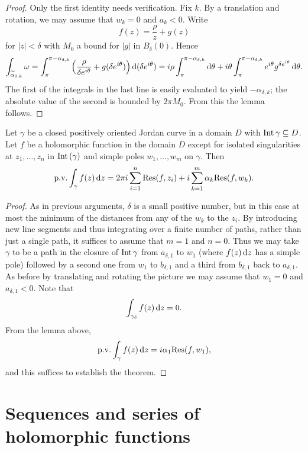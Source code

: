 \begin{proof}
Only the first identity needs verification. Fix $k$. By a translation and rotation, we may assume that $w_k=0$ and $a_k<0$. Write
\[f(z)=\frac{\rho}{z}+g(z)\]
for $|z|<\delta$ with $M_0$ a bound for $|g|$ in $B_{\delta}(0)$. Hence
\[\int_{\widetilde{\alpha}_{\delta,k}}\omega=\int_{\pi}^{\pi-\alpha_{\delta,k}}\Big(\frac{\rho}{\delta e^{i\theta}}+g(\delta e^{i\theta})\Big)\mathop{}\!\mathrm{d}(\delta e^{i\theta})=i\rho\int_{\pi}^{\pi-\alpha_{\delta,k}}\mathop{}\!\mathrm{d}\theta+i\theta\int_{\pi}^{\pi-\alpha_{\delta,k}}e^{i\theta}g^{\delta e^{i\theta}}\mathop{}\!\mathrm{d}\theta.\]
The first of the integrals in the last line is easily evaluated to yield $-\alpha_{\delta,k}$; the absolute value of the second is bounded by $2\pi M_0$. From this the lemma follows.
\end{proof}
\begin{theorem}\label{residue theorem with singularities}
Let $\gamma$ be a closed positively oriented Jordan curve in a domain $D$ with $\mathrm{Int}\,\gamma\subseteq D$. Let $f$ be a holomorphic function in the domain $D$ except for isolated singularities at $z_1,\dots,z_n$ in $\mathrm{Int}\,(\gamma)$ and simple poles $w_1,\dots,w_m$ on $\gamma$. Then
\[\mathrm{p.v.}\int_{\gamma}f(z)\mathop{}\!\mathrm{d} z=2\pi i\sum_{i=1}^{n}\mathrm{Res}(f,z_i)+i\sum_{k=1}^{m}\alpha_k\mathrm{Res}(f,w_k).\]
\end{theorem}
\begin{proof}
As in previous arguments, $\delta$ is a small positive number, but in this case at most the minimum of the distances from any of the $w_k$ to the $z_i$. By introducing new line segments and thus integrating over a finite number of paths, rather than just a single path, it suffices to assume that $m=1$ and $n=0$. Thus we may take $\gamma$ to be a path in the closure of $\mathrm{Int}\,\gamma$ from $a_{\delta,1}$ to $w_1$ (where $f(z)\mathop{}\!\mathrm{d} z$ has a simple pole) followed by a second one from $w_1$ to $b_{\delta,1}$ and a third from $b_{\delta,1}$ back to $a_{\delta,1}$. As before by translating and rotating the picture we may assume that $w_1=0$ and $a_{\delta,1}<0$. Note that
\[\int_{\gamma_{\delta}}f(z)\mathop{}\!\mathrm{d} z=0.\]
From the lemma above,
\[\mathrm{p.v.}\int_{\gamma}f(z)\mathop{}\!\mathrm{d} z=i\alpha_1\mathrm{Res}(f,w_1),\]
and this suffices to establish the theorem.
\end{proof}
\section{Sequences and series of holomorphic functions}
